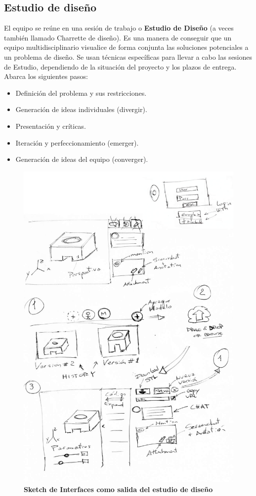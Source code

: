 \subsection{Estudio de diseño}
El equipo se reúne en una sesión de trabajo o \textbf{Estudio de Diseño} (a veces también llamado Charrette de diseño)\citep{Gothelf2013}. Es una manera de conseguir que un equipo multidisciplinario visualice de forma conjunta las soluciones potenciales a un problema de diseño. Se usan técnicas específicas para llevar a cabo las sesiones de Estudio, dependiendo de la situación del proyecto y los plazos de entrega. Abarca los siguientes pasos:
\begin{itemize}
    \item Definición del problema y sus restricciones. 
    \item Generación de ideas individuales (divergir). 
    \item Presentación y críticas. 
    \item Iteración y perfeccionamiento (emerger). 
    \item Generación de ideas del equipo (converger).
\end{itemize}


\begin{figure}[h]
\includegraphics[width=14cm]{Img/UX/edc.jpg}
\centering
\caption{\textbf{ \footnotesize{Sketch de Interfaces como salida del estudio de diseño}}}
\end{figure}


